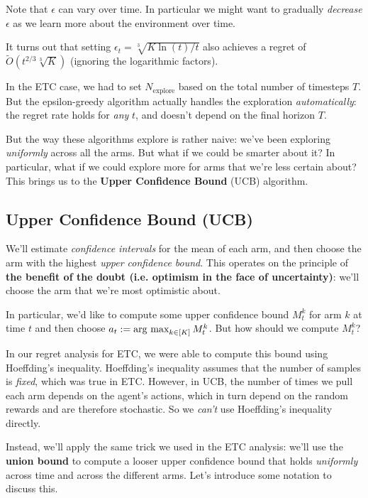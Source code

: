\documentclass[../main/main]{subfiles}
\begin{document}
Note that $\epsilon$ can vary over time. In particular we might want to gradually \emph{decrease} $\epsilon$ as we learn more about the environment over time.

It turns out that setting $\epsilon_t = \sqrt[3]{K \ln(t)/t}$ also achieves a regret of $\tilde O(t^{2/3} \sqrt[3]{K})$ (ignoring the logarithmic factors).


In the ETC case, we had to set $N_{\text{explore}}$ based on the total number of timesteps $T$. But the epsilon-greedy algorithm actually handles the exploration \emph{automatically}: the regret rate holds for \emph{any} $t$, and doesn't depend on the final horizon $T$.

But the way these algorithms explore is rather naive: we've been exploring \emph{uniformly} across all the arms. But what if we could be smarter about it? In particular, what if we could explore more for arms that we're less certain about? This brings us to the \textbf{Upper Confidence Bound} (UCB) algorithm.


\subsection{Upper Confidence Bound (UCB)}



We'll estimate \emph{confidence intervals} for the mean of each arm, and then choose the arm with the highest \emph{upper confidence bound}. This operates on the principle of \textbf{the benefit of the doubt (i.e. optimism in the face of uncertainty)}: we'll choose the arm that we're most optimistic about.

In particular, we'd like to compute some upper confidence bound $M^k_t$ for arm $k$ at time $t$ and then choose $a_t := \operatorname*{\textrm{arg\ max}}_{k \in [K]} M^k_t$. But how should we compute $M^k_t$?

In our regret analysis for ETC, we were able to compute this bound using Hoeffding's inequality. Hoeffding's inequality assumes that the number of samples is \emph{fixed}, which was true in ETC. However, in UCB, the number of times we pull each arm depends on the agent's actions, which in turn depend on the random rewards and are therefore stochastic. So we \emph{can't} use Hoeffding's inequality directly.

Instead, we'll apply the same trick we used in the ETC analysis: we'll use the \textbf{union bound} to compute a looser upper confidence bound that holds \emph{uniformly} across time and across the different arms. Let's introduce some notation to discuss this.
\end{document}
